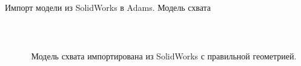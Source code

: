 \documentclass[12pt, aspectratio=169]{beamer}
\begin{document}
    \begin{frame}{Импорт модели из SolidWorks в Adams. Модель схвата}\relax
          \begin{columns}[T,onlytextwidth]
            \begin{column}{0.5\textwidth}
              \vspace{-0.5cm}
            \end{column}
            \begin{column}{0.5\textwidth}
            \vspace{-1.0cm}
               \\\begin{flushleft} Модель схвата импортирована из SolidWorks с правильной геометрией.\end{flushleft}
            \end{column}
    \end{columns}
    \end{frame}
\end{document}
